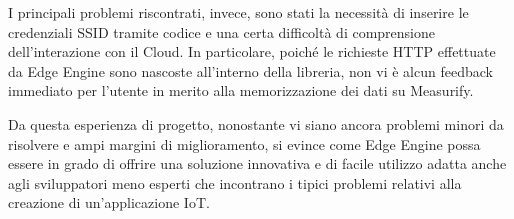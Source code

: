 I principali problemi riscontrati, invece, sono stati la necessità di inserire le credenziali SSID tramite codice e una certa difficoltà di comprensione dell'interazione con il Cloud. In particolare, poiché le richieste HTTP effettuate da Edge Engine sono nascoste all'interno della libreria, non vi è alcun feedback immediato per l'utente in merito alla memorizzazione dei dati su Measurify.

Da questa esperienza di progetto, nonostante vi siano ancora problemi minori da risolvere e ampi margini di miglioramento, si evince come Edge Engine possa essere in grado di offrire una soluzione innovativa e di facile utilizzo adatta anche agli sviluppatori meno esperti che incontrano i tipici problemi relativi alla creazione di un'applicazione IoT.



